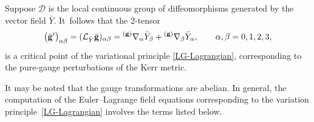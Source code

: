 \documentclass[11pt]{article}
\numberwithin{equation}{section}
\def\grad{{\nabla}}%
\newcommand{\leftexp}[2]{{\vphantom{#2}}^{#1}{#2}}
\def \a{\alpha}
\def \b {\beta}
\renewcommand{\gg}{{\bf g}}
\renewcommand{\a}{\alpha}
\renewcommand{\b}{\beta}
\numberwithin{equation}{section}
\begin{document}
Suppose $\mathcal{D}$ is the local continuous group of diffeomorphisms generated by the vector field $\bar{Y}$. It~follows that the 2-tensor
\begin{align*}
\bigl(\bar{\gg}'\bigr)_{\a \b} = (\mathcal{L}_{\bar{Y}} \bar{\gg})_{\a \b} = \leftexp{(\gg)}{\grad}_\a \bar{Y}_\b + \leftexp{(\gg)}{\grad}_\b \bar{Y}_\a, \qquad \a, \b = 0, 1, 2, 3,
\end{align*}
is a critical point of the variational principle \eqref{LG-Lagrangian}, corresponding to the pure-gauge perturbations of the Kerr metric.

 It may be noted that the gauge transformations are abelian. In general, the computation of the Euler--Lagrange field equations corresponding to the variation principle~\eqref{LG-Lagrangian} involves the terms listed below.
\end{document}
